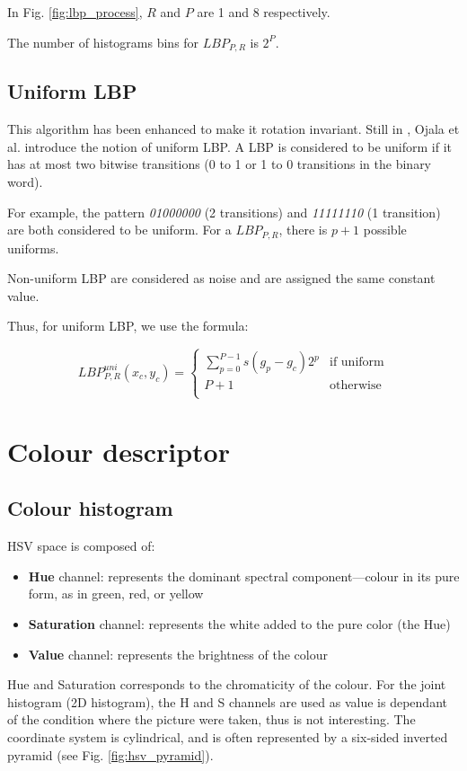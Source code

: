 In Fig. \ref{fig:lbp_process}, $R$ and $P$ are 1 and 8 respectively.

The number of histograms bins for $LBP_{P, R}$ is $2^P$.

\subsection{Uniform LBP}

This algorithm has been enhanced to make it rotation invariant. Still in \cite{Ojala2002}, Ojala et al. introduce the notion of uniform LBP. A LBP is considered to be uniform if it has at most two bitwise transitions (0 to 1 or 1 to 0 transitions in the binary word). 

For example, the pattern \textit{01000000}  (2 transitions) and \textit{11111110} (1 transition) are both considered to be uniform. For a $LBP_{P, R}$, there is $p + 1$ possible uniforms.

Non-uniform LBP are considered as noise and are assigned the same constant value.

Thus, for uniform LBP, we use the formula:

$$
LBP_{P, R}^{uni} (x_c, y_c) = 
\begin{cases} \displaystyle
\sum_{p = 0}^{P - 1} s (g_p - g_c) 2^p & \text{if uniform} \\
P + 1 & \text{otherwise} \\
\end{cases}
$$

\section{Colour descriptor}
\subsection{Colour histogram}

HSV space is composed of:
\begin{itemize}
    \item \textbf{Hue} channel: represents the dominant spectral component—colour in its pure form, as in green, red, or yellow
    \item \textbf{Saturation} channel: represents the white added to the pure color (the Hue)
    \item \textbf{Value} channel: represents the brightness of the colour
\end{itemize}

Hue and Saturation corresponds to the chromaticity of the colour. For the joint histogram (2D histogram), the H and S channels are used as value is dependant of the condition where the picture were taken, thus is not interesting. The coordinate system is cylindrical, and is often represented by a six-sided inverted pyramid (see Fig. \ref{fig:hsv_pyramid}).

